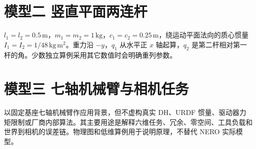 \section*{模型二 竖直平面两连杆}

$l_1=l_2=0.5\,\mathrm m$，$m_1=m_2=1\,\mathrm{kg}$，$c_1=c_2=0.25\,\mathrm m$，绕运动平面法向的质心惯量 $I_1=I_2=1/48\,\mathrm{kg\,m^2}$。重力沿 $-y$，$q_1$ 从水平正 $x$ 轴起算，$q_2$ 是第二杆相对第一杆的角。少数独立算例采用其它数值时会明确重列参数。

\section*{模型三 七轴机械臂与相机任务}

以固定基座七轴机械臂作应用背景，但不虚构真实 DH、URDF 惯量、驱动器力矩限制或厂商内部算法。其主要用途是解释六维任务、冗余、零空间、工具负载和世界到相机的误差链。物理图和低维算例用于说明原理，不替代 NERO 实际模型。

\clearpage
\tableofcontents
\clearpage
\listoffigures
\clearpage
